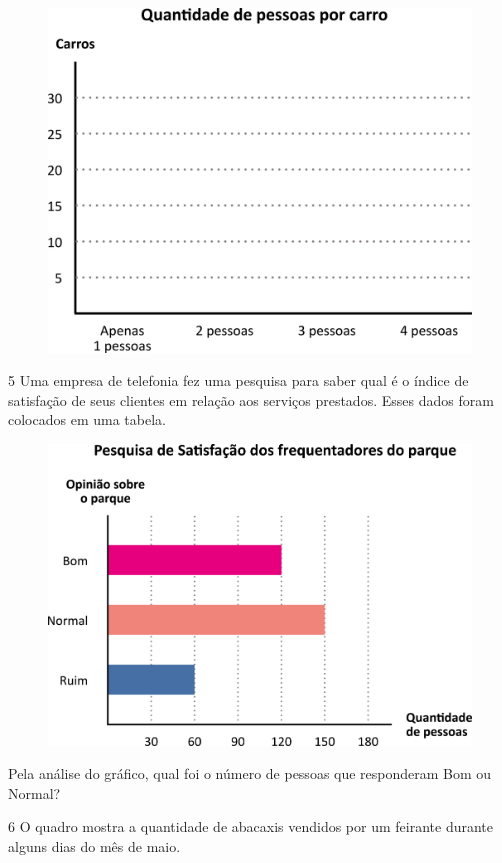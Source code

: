 \begin{figure}[htpb!]
\centering
\includegraphics[width=\textwidth]{./media/image81.png}
\end{figure}

\num{5} Uma empresa de telefonia fez uma pesquisa para saber qual é o índice de
satisfação de seus clientes em relação aos serviços prestados. Esses dados foram
colocados em uma tabela.

\begin{figure}[htpb!]
\centering
\includegraphics[width=.8\textwidth]{./media/image82.png}
\end{figure}

Pela análise do gráfico, qual foi o número de pessoas que
responderam Bom ou Normal? 

\num{6} O quadro mostra a quantidade de abacaxis vendidos por um feirante
durante alguns dias do mês de maio.

